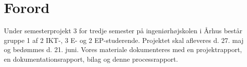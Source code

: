 \chapter{Forord}

Under semesterprojekt 3 for tredje semester på ingeniørhøjskolen i Århus består gruppe 1 af 2 IKT-, 3 E- og 2 EP-studerende. 
Projektet skal afleveres d. 27. maj og bedømmes d. 21. juni.
Vores materiale dokumenteres med en projektrapport, en dokumentationsrapport, bilag og denne processrapport.